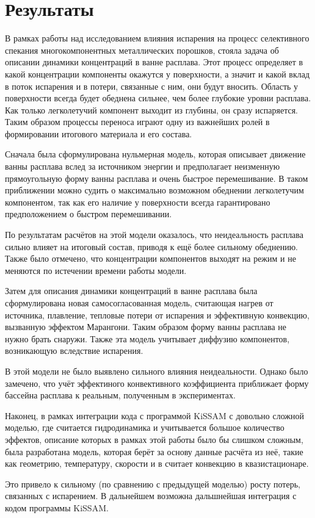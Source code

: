\section{Результаты}

В рамках работы над исследованием влияния испарения на процесс селективного спекания многокомпонентных металлических порошков, стояла задача об описании динамики концентраций в ванне расплава. Этот процесс определяет в какой концентрации компоненты окажутся у поверхности, а значит и какой вклад в поток испарения и в потери, связанные с ним, они будут вносить.
Область у поверхности всегда будет обеднена сильнее, чем более глубокие уровни расплава. Как только легколетучий компонент выходит из глубины, он сразу испаряется. Таким образом процессы переноса играют одну из важнейших ролей в формировании итогового материала и его состава.

Сначала была сформулирована нульмерная модель, которая описывает движение ванны расплава вслед за источником энергии и предполагает неизменную прямоугольную форму ванны расплава и очень быстрое перемешивание. В таком приближении можно судить о максимально возможном обеднении легколетучим компонентом, так как его наличие у поверхности всегда гарантировано предположением о быстром перемешивании. 

По результатам расчётов на этой модели оказалось, что неидеальность расплава сильно влияет на итоговый состав, приводя к ещё более сильному обеднению. Также было отмечено, что концентрации компонентов выходят на режим и не меняются по истечении времени работы модели.

Затем для описания динамики концентраций в ванне расплава была сформулирована новая самосогласованная модель, считающая нагрев от источника, плавление, тепловые потери от испарения и эффективную конвекцию, вызванную эффектом Марангони. Таким образом форму ванны расплава не нужно брать снаружи. Также эта модель учитывает диффузию компонентов, возникающую вследствие испарения.

В этой модели не было выявлено сильного влияния неидеальности. Однако было замечено, что учёт эффектиного конвективного коэффициента приближает форму бассейна расплава к реальным, полученным в экспериментах.

Наконец, в рамках интеграции кода с программой KiSSAM с довольно сложной моделью, где считается гидродинамика и учитывается большое количество эффектов, описание которых в рамках этой работы было бы слишком сложным, была разработана модель, которая берёт за основу данные расчёта из неё, такие как геометрию, температуру, скорости и в считает конвекцию в квазистационаре.

Это привело к сильному (по сравнению с предыдущей моделью) росту потерь, связанных с испарением. 
В дальнейшем возможна дальшнейшая интеграция с кодом программы KiSSAM.

\clearpage
